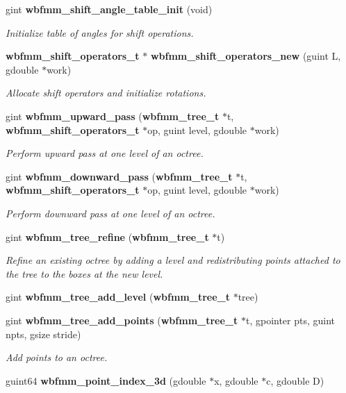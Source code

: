 \begin{DoxyCompactItemize}
gint {\bf wbfmm\+\_\+shift\+\_\+angle\+\_\+table\+\_\+init} (void)
\begin{DoxyCompactList}\small\item\em Initialize table of angles for shift operations. \end{DoxyCompactList}\item 
{\bf wbfmm\+\_\+shift\+\_\+operators\+\_\+t} $\ast$ {\bf wbfmm\+\_\+shift\+\_\+operators\+\_\+new} (guint L, gdouble $\ast$work)
\begin{DoxyCompactList}\small\item\em Allocate shift operators and initialize rotations. \end{DoxyCompactList}\item 
gint {\bf wbfmm\+\_\+upward\+\_\+pass} ({\bf wbfmm\+\_\+tree\+\_\+t} $\ast$t, {\bf wbfmm\+\_\+shift\+\_\+operators\+\_\+t} $\ast$op, guint level, gdouble $\ast$work)
\begin{DoxyCompactList}\small\item\em Perform upward pass at one level of an octree. \end{DoxyCompactList}\item 
gint {\bf wbfmm\+\_\+downward\+\_\+pass} ({\bf wbfmm\+\_\+tree\+\_\+t} $\ast$t, {\bf wbfmm\+\_\+shift\+\_\+operators\+\_\+t} $\ast$op, guint level, gdouble $\ast$work)
\begin{DoxyCompactList}\small\item\em Perform downward pass at one level of an octree. \end{DoxyCompactList}\item 
gint {\bf wbfmm\+\_\+tree\+\_\+refine} ({\bf wbfmm\+\_\+tree\+\_\+t} $\ast$t)
\begin{DoxyCompactList}\small\item\em Refine an existing octree by adding a level and redistributing points attached to the tree to the boxes at the new level. \end{DoxyCompactList}\item 
gint {\bf wbfmm\+\_\+tree\+\_\+add\+\_\+level} ({\bf wbfmm\+\_\+tree\+\_\+t} $\ast$tree)
\item 
gint {\bf wbfmm\+\_\+tree\+\_\+add\+\_\+points} ({\bf wbfmm\+\_\+tree\+\_\+t} $\ast$t, gpointer pts, guint npts, gsize stride)
\begin{DoxyCompactList}\small\item\em Add points to an octree. \end{DoxyCompactList}\item 
guint64 {\bf wbfmm\+\_\+point\+\_\+index\+\_\+3d} (gdouble $\ast$x, gdouble $\ast$c, gdouble D)

\end{DoxyCompactItemize}
